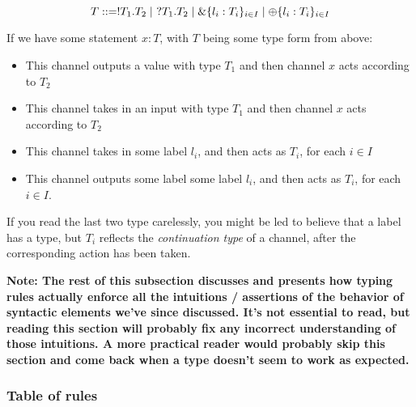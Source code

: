 $$
T ::= !T_1.T_2 \mid \ ?T_1.T_2 \mid \&\{l_i : T_i\}_{i \in I} \mid \oplus \{l_i : T_i\}_{i \in I}
$$

If we have some statement $x : T$, with $T$ being some type form from above:
\begin{itemize}
    \item This channel outputs a value with type $T_1$ and then channel $x$ acts according to $T_2$
    \item This channel takes in an input with type $T_1$ and then channel $x$ acts according to $T_2$
    \item This channel takes in some label $l_i$, and then acts as $T_i$, for each $i \in I$
    \item This channel outputs some label some label $l_i$, and then acts as $T_i$, for each $i \in I$.
\end{itemize}

If you read the last two type carelessly, you might be led to believe that a label has a type, but $T_i$ reflects the \textit{continuation type} of a channel, after the corresponding action has been taken.

\textbf{Note: The rest of this subsection discusses and presents how typing rules actually enforce all the intuitions / assertions of the behavior of syntactic elements we've since discussed. It's not essential to read, but reading this section will probably fix any incorrect understanding of those intuitions. A more practical reader would probably skip this section and come back when a type doesn't seem to work as expected.}


\subsubsection{Table of rules}
